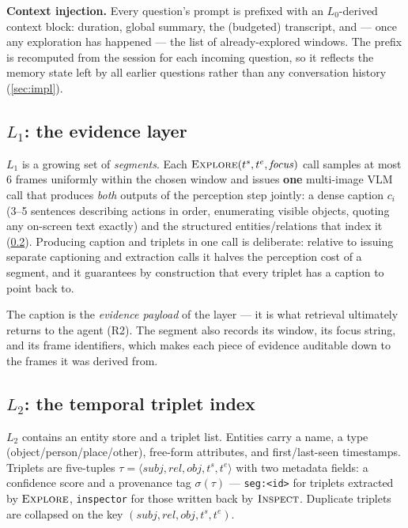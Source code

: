 \textbf{Context injection.} Every question's prompt is prefixed with an $L_0$-derived context block:
duration, global summary, the (budgeted) transcript, and --- once any exploration has happened ---
the list of already-explored windows. The prefix is recomputed from the session for each incoming
question, so it reflects the memory state left by all earlier questions rather than any
conversation history (\cref{sec:impl}).

\subsection{$L_1$: the evidence layer}
\label{subsec:l1}

$L_1$ is a growing set of \emph{segments}. Each $\textsc{Explore}(t^{s}, t^{e}, \mathit{focus})$ call
samples at most 6 frames uniformly within the chosen window and issues \textbf{one} multi-image VLM
call that produces \emph{both} outputs of the perception step jointly: a dense caption $c_i$ (3--5
sentences describing actions in order, enumerating visible objects, quoting any on-screen text
exactly) and the structured entities/relations that index it (\cref{subsec:l2}). Producing caption and
triplets in one call is deliberate: relative to issuing separate captioning and extraction calls
it halves the perception cost of a segment, and it guarantees by construction that every triplet
has a caption to point back to.

The caption is the \emph{evidence payload} of the layer --- it is what retrieval ultimately returns to
the agent (R2). The segment also records its window, its focus string, and its frame identifiers,
which makes each piece of evidence auditable down to the frames it was derived from.

\subsection{$L_2$: the temporal triplet index}
\label{subsec:l2}

$L_2$ contains an entity store and a triplet list. Entities carry a name, a type
(object/person/place/other), free-form attributes, and first/last-seen timestamps. Triplets are
five-tuples $\tau = \langle \mathit{subj}, \mathit{rel}, \mathit{obj}, t^{s}, t^{e} \rangle$ with
two metadata fields: a confidence score and a provenance tag $\sigma(\tau)$ --- \texttt{seg:<id>} for
triplets extracted by $\textsc{Explore}$, \texttt{inspector} for those written back by
$\textsc{Inspect}$. Duplicate triplets are collapsed on the key
$(\mathit{subj}, \mathit{rel}, \mathit{obj}, t^{s}, t^{e})$.

